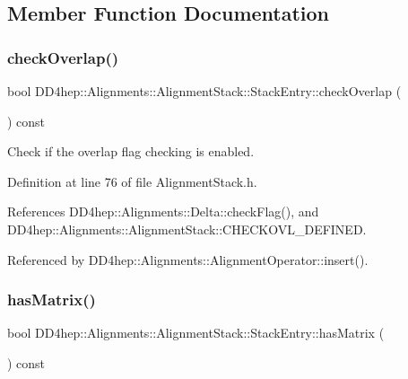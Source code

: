 \subsection{Member Function Documentation}
\hypertarget{struct_d_d4hep_1_1_alignments_1_1_alignment_stack_1_1_stack_entry_a3444dae73770098e181f771a13ee389e}{}\label{struct_d_d4hep_1_1_alignments_1_1_alignment_stack_1_1_stack_entry_a3444dae73770098e181f771a13ee389e} 
\subsubsection{\texorpdfstring{check\+Overlap()}{checkOverlap()}}
{\footnotesize\ttfamily bool D\+D4hep\+::\+Alignments\+::\+Alignment\+Stack\+::\+Stack\+Entry\+::check\+Overlap (\begin{DoxyParamCaption}{ }\end{DoxyParamCaption}) const\hspace{0.3cm}{\ttfamily [inline]}}



Check if the overlap flag checking is enabled. 



Definition at line 76 of file Alignment\+Stack.\+h.



References D\+D4hep\+::\+Alignments\+::\+Delta\+::check\+Flag(), and D\+D4hep\+::\+Alignments\+::\+Alignment\+Stack\+::\+C\+H\+E\+C\+K\+O\+V\+L\+\_\+\+D\+E\+F\+I\+N\+ED.



Referenced by D\+D4hep\+::\+Alignments\+::\+Alignment\+Operator\+::insert().

\hypertarget{struct_d_d4hep_1_1_alignments_1_1_alignment_stack_1_1_stack_entry_a96f255d40cf16b0cfbf37496dafac7bd}{}\label{struct_d_d4hep_1_1_alignments_1_1_alignment_stack_1_1_stack_entry_a96f255d40cf16b0cfbf37496dafac7bd} 
\subsubsection{\texorpdfstring{has\+Matrix()}{hasMatrix()}}
{\footnotesize\ttfamily bool D\+D4hep\+::\+Alignments\+::\+Alignment\+Stack\+::\+Stack\+Entry\+::has\+Matrix (\begin{DoxyParamCaption}{ }\end{DoxyParamCaption}) const\hspace{0.3cm}{\ttfamily [inline]}}



